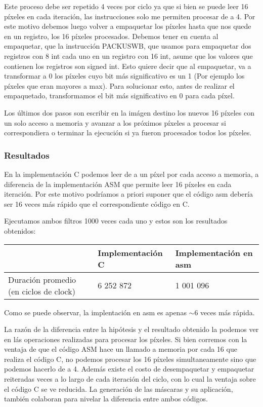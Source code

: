 Este proceso debe ser repetido 4 veces por ciclo ya que si bien se puede leer 16 píxeles en cada iteración, las instrucciones solo me permiten procesar de a 4. Por este motivo debemos luego volver a empaquetar los píxeles hasta que nos quede en un registro, los 16 píxeles procesados. Debemos tener en cuenta al empaquetar, que la instrucción PACKUSWB, que usamos para empaquetar dos registros con 8 int cada uno en un registro con 16 int, asume que los valores que contienen los registros son signed int. Esto quiere decir que al empaquetar, va a transformar a 0 los píxeles cuyo bit más significativo es un 1 (Por ejemplo los píxeles que eran mayores a max). Para solucionar esto, antes de realizar el empaquetado, transformamos el bit más significativo en 0 para cada píxel.


Los últimos dos pasos son escribir en la imágen destino los nuevos 16 píxeles con un solo acceso a memoria y avanzar a los próximos píxeles a procesar si correspondiera o terminar la ejecución si ya fueron procesados todos los píxeles.

\subsubsection{Resultados}

En la implementación C podemos leer de a un píxel por cada acceso a memoria, a diferencia de la implementación ASM que permite leer 16 píxeles en cada iteración. Por este motivo podríamos a priori suponer que el código asm debería ser 16 veces más rápido que el correspondiente código en C.

Ejecutamos ambos filtros 1000 veces cada uno y estos son los resultados obtenidos:

\begin{center}
    \begin{tabular}{|l|l|l|}
        \hline
         & Implementación C & Implementación en asm  \\
        \hline
        Duración promedio (en ciclos de clock) & 6 252 872        & 1 001 096 \\
        \hline
    \end{tabular}
\end{center}

Como se puede observar, la implentación en asm es apenas $\sim$6 veces más rápida.
 
 
La razón de la diferencia entre la hipótesis y el resultado obtenido la podemos ver en lás operaciones realizadas para procesar los píxeles. Si bien corremos con la ventaja de que el código ASM hace un llamado a memoria por cada 16 que realiza el código C, no podemos procesar los 16 píxeles simultaneamente sino que podemos hacerlo de a 4. Además existe el costo de desempaquetar y empaquetar reiteradas veces a lo largo de cada iteración del ciclo, con lo cual la ventaja sobre el código C se ve reducida. La generación de las máscaras y su aplicación, también colaboran para nivelar la diferencia entre ambos códigos.


